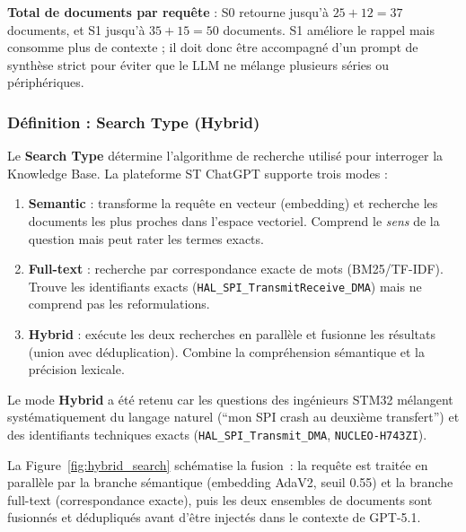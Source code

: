 \textbf{Total de documents par requête} : S0 retourne jusqu'à $25 + 12 = 37$ documents, et S1 jusqu'à $35 + 15 = 50$ documents. S1 améliore le rappel mais consomme plus de contexte ; il doit donc être accompagné d'un prompt de synthèse strict pour éviter que le LLM ne mélange plusieurs séries ou périphériques.

\subsubsection{Définition : Search Type (Hybrid)}
\label{sec:search_type}

Le \textbf{Search Type} détermine l'algorithme de recherche utilisé pour interroger la Knowledge Base. La plateforme ST ChatGPT supporte trois modes :

\begin{enumerate}
  \item \textbf{Semantic} : transforme la requête en vecteur (embedding) et recherche les documents les plus proches dans l'espace vectoriel. Comprend le \textit{sens} de la question mais peut rater les termes exacts.
  \item \textbf{Full-text} : recherche par correspondance exacte de mots (BM25/TF-IDF). Trouve les identifiants exacts (\texttt{HAL\_SPI\_TransmitReceive\_DMA}) mais ne comprend pas les reformulations.
  \item \textbf{Hybrid} : exécute les deux recherches en parallèle et fusionne les résultats (union avec déduplication). Combine la compréhension sémantique et la précision lexicale.
\end{enumerate}

Le mode \textbf{Hybrid} a été retenu car les questions des ingénieurs STM32 mélangent systématiquement du langage naturel (``mon SPI crash au deuxième transfert'') et des identifiants techniques exacts (\texttt{HAL\_SPI\_Transmit\_DMA}, \texttt{NUCLEO-H743ZI}).

La Figure~\ref{fig:hybrid_search} schématise la fusion~: la requête est traitée en parallèle par la branche sémantique (embedding AdaV2, seuil 0.55) et la branche full-text (correspondance exacte), puis les deux ensembles de documents sont fusionnés et dédupliqués avant d'être injectés dans le contexte de GPT-5.1.

